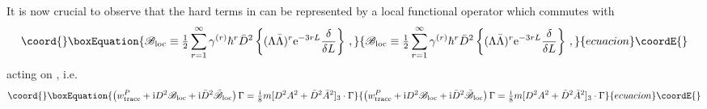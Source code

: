 \documentclass[a4paper,12pt]{article}
\providecommand{\Bl}{{\mathscr B}_{\rm loc}}
\providecommand{\Blb}{\bar {\mathscr B}_{\rm loc}}
\providecommand{\e}{{\rm e}}
\providecommand{\I}{{\rm i}}
\providecommand{\half}{{\textstyle \frac{1}{2}}}
\providecommand{\tfr}[2]{{\textstyle \frac{#1}{#2}}}
\providecommand{\fdq}[2]{\frac{\delta #1}{\delta #2}}
\begin{document}
It is now crucial to observe that the hard terms in \coordHE{} can be
represented by a local functional operator which commutes with \coordHE{}
\begin{equation}\coord{}\boxEquation{
\Bl \equiv \half \sum_{r=1}^\infty \gamma^{(r)} \hbar^r \bar D^2 \left\{
  (\Lambda \bar   \Lambda)^r \e^{-3rL} \fdq{}{L} \right\}\,,
}{
\Bl \equiv \half \sum_{r=1}^\infty \gamma^{(r)} \hbar^r \bar D^2 \left\{
  (\Lambda \bar   \Lambda)^r \e^{-3rL} \fdq{}{L} \right\}\,,
}{ecuacion}\coordE{}\end{equation}
acting on \myHighlight{$\Gamma$}\coordHE{}, i.e.\
\begin{equation}\coord{}\boxEquation{
\left( w_{\rm trace}^P + \I D^2 \Bl+ \I \bar D^2 \Blb \right) \Gamma =
\tfr{\I}{8} m [D^2 A^2 + \bar D^2 \bar A^2]_3 \cdot
\Gamma \label{CSlocal}
}{
\left( w_{\rm trace}^P + \I D^2 \Bl+ \I \bar D^2 \Blb \right) \Gamma =
\tfr{\I}{8} m [D^2 A^2 + \bar D^2 \bar A^2]_3 \cdot
\Gamma }{ecuacion}\coordE{}\end{equation}
\end{document}
